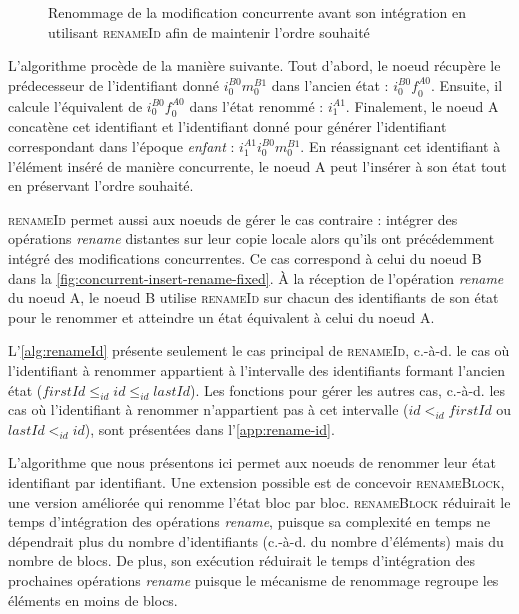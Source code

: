 \documentclass[12pt]{thesul}
\newcommand{\ie}{c.-à-d. }
\newcommand{\trm}[1]{\mathit{#1}}
\newcommand{\id}[3]{$\trm{#1}^{\trm{#2}}_{\trm{#3}}$}
\begin{document}
\begin{figure}[!ht]
{\begin{tikzpicture}
    \end{tikzpicture}
  }
  \caption{Renommage de la modification concurrente avant son intégration en utilisant \textsc{renameId} afin de maintenir l'ordre souhaité}
  \label{fig:concurrent-insert-rename-fixed}
\end{figure}

L'algorithme procède de la manière suivante.
Tout d'abord, le noeud récupère le prédecesseur de l'identifiant donné \id{i}{B0}{0}\id{m}{B1}{0} dans l'ancien état : \id{i}{B0}{0}\id{f}{A0}{0}.
Ensuite, il calcule l'équivalent de \id{i}{B0}{0}\id{f}{A0}{0} dans l'état renommé : \id{i}{A1}{1}.
Finalement, le noeud A concatène cet identifiant et l'identifiant donné pour générer l'identifiant correspondant dans l'époque \emph{enfant} : \id{i}{A1}{1}\id{i}{B0}{0}\id{m}{B1}{0}.
En réassignant cet identifiant à l'élément inséré de manière concurrente, le noeud A peut l'insérer à son état tout en préservant l'ordre souhaité.

\textsc{renameId} permet aussi aux noeuds de gérer le cas contraire : intégrer des opérations \emph{rename} distantes sur leur copie locale alors qu'ils ont précédemment intégré des modifications concurrentes.
Ce cas correspond à celui du noeud B dans la \autoref{fig:concurrent-insert-rename-fixed}.
À la réception de l'opération \emph{rename} du noeud A, le noeud B utilise \textsc{renameId} sur chacun des identifiants de son état pour le renommer et atteindre un état équivalent à celui du noeud A.

L'\autoref{alg:renameId} présente seulement le cas principal de \textsc{renameId}, \ie le cas où l'identifiant à renommer appartient à l'intervalle des identifiants formant l'ancien état ($\trm{firstId} \leq_{id} \trm{id} \leq_{id} \trm{lastId}$).
Les fonctions pour gérer les autres cas, \ie les cas où l'identifiant à renommer n'appartient pas à cet intervalle ($\trm{id} <_{id} \trm{firstId}$ ou $\trm{lastId} <_{id} \trm{id}$), sont présentées dans l'\autoref{app:rename-id}.

L'algorithme que nous présentons ici permet aux noeuds de renommer leur état identifiant par identifiant.
Une extension possible est de concevoir \textsc{renameBlock}, une version améliorée qui renomme l'état bloc par bloc.
\textsc{renameBlock} réduirait le temps d'intégration des opérations \emph{rename}, puisque sa complexité en temps ne dépendrait plus du nombre d'identifiants (\ie du nombre d'éléments) mais du nombre de blocs.
De plus, son exécution réduirait le temps d'intégration des prochaines opérations \emph{rename} puisque le mécanisme de renommage regroupe les éléments en moins de blocs.
\end{document}
